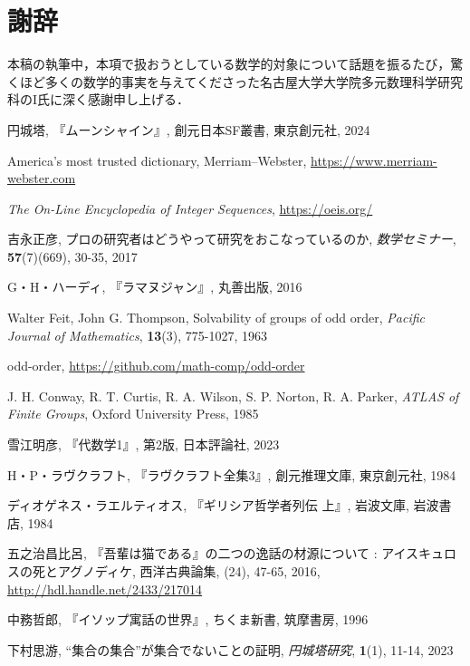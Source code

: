 \documentclass[10pt, a5paper, twoside]{jsarticle}
\theoremstyle{definition}
\begin{document}
	\section{謝辞}

		本稿の執筆中，本項で扱おうとしている数学的対象について話題を振るたび，驚くほど多くの数学的事実を与えてくださった名古屋大学大学院多元数理科学研究科のI氏に深く感謝申し上げる．

	\begin{thebibliography}{99}

		 円城塔, 『ムーンシャイン』, 創元日本SF叢書, 東京創元社, 2024

		 America's most trusted dictionary, Merriam--Webster, \url{https://www.merriam-webster.com}

		 \textit{The On-Line Encyclopedia of Integer Sequences}, \url{https://oeis.org/}

		 吉永正彦, プロの研究者はどうやって研究をおこなっているのか, \textit{数学セミナー}, \textbf{57}(7)(669), 30-35, 2017

		 G・H・ハーディ, 『ラマヌジャン』, 丸善出版, 2016

		 Walter Feit, John G. Thompson, Solvability of groups of odd order, \textit{Pacific Journal of Mathematics}, \textbf{13}(3), 775-1027, 1963

		 odd-order, \url{https://github.com/math-comp/odd-order}

		 J. H. Conway, R. T. Curtis, R. A. Wilson, S. P. Norton, R. A. Parker, \textit{ATLAS of Finite Groups}, Oxford University Press, 1985

		 雪江明彦, 『代数学1』, 第2版, 日本評論社, 2023

		 H・P・ラヴクラフト, 『ラヴクラフト全集3』, 創元推理文庫, 東京創元社, 1984

		 ディオゲネス・ラエルティオス, 『ギリシア哲学者列伝 上』, 岩波文庫, 岩波書店, 1984

		 五之治昌比呂, 『吾輩は猫である』の二つの逸話の材源について : アイスキュロスの死とアグノディケ, 西洋古典論集, (24), 47-65, 2016, \url{http://hdl.handle.net/2433/217014}

		 中務哲郎, 『イソップ寓話の世界』, ちくま新書, 筑摩書房, 1996

		 下村思游, “集合の集合”が集合でないことの証明, \textit{円城塔研究}, \textbf{1}(1), 11-14, 2023


\end{thebibliography}
\end{document}
